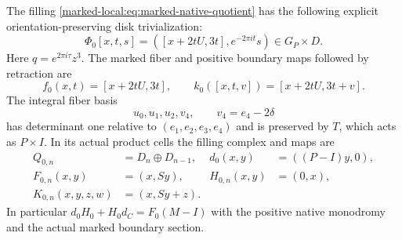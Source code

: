 \begin{theorem}\label{marked-local:thm:marked-native-filling}
The filling \eqref{marked-local:eq:marked-native-quotient} has the following
explicit orientation-preserving disk trivialization:
\begin{equation}\label{marked-local:eq:marked-native-Phi}
 \Phi_0[x,t,s]=([x+2tU,3t],e^{-2\pi it}s)
                 \in G_P\times D.
\end{equation}
Here $q=e^{2\pi i\tau}z^3$. The marked fiber and positive
boundary maps followed by retraction are
\begin{equation}\label{marked-local:eq:marked-native-FK}
 f_0(x,t)=[x+2tU,3t],\qquad
 k_0([x,t,v])=[x+2tU,3t+v].
\end{equation}
The integral fiber basis
\begin{equation}\label{marked-local:eq:marked-cell-basis}
             u_0,u_1,u_2,v_4,\qquad v_4=e_4-2\delta
\end{equation}
has determinant one relative to $(e_1,e_2,e_3,e_4)$ and is
preserved by $T$, which acts as $P\times I$. In its actual
product cells the filling complex and maps are
\begin{equation}\label{marked-local:eq:marked-final-chains}
 \begin{aligned}
 Q_{0,n}&=D_n\oplus D_{n-1},&d_0(x,y)&=((P-I)y,0),\\
 F_{0,n}(x,y)&=(x,Sy),&H_{0,n}(x,y)&=(0,x),\\
 K_{0,n}(x,y,z,w)&=(x,Sy+z).&&
 \end{aligned}
\end{equation}
In particular $d_0H_0+H_0d_C=F_0(M-I)$ with the positive
native monodromy and the actual marked boundary section.
\end{theorem}

